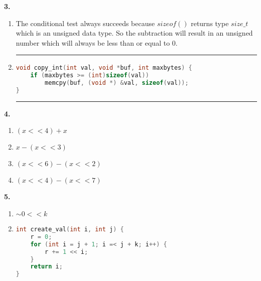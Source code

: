 \documentclass[11pt]{article} %
\newcommand{\hr}{\noindent\rule{14cm}{0.4pt}}
\begin{document}
\vspace{0.5in}
{\bf 3.}
\begin{enumerate}[label=\alph*)]
\item
The conditional test always succeeds because $sizeof()$ returns type $size\_t$ which is an unsigned data type. So the subtraction will result in an unsigned number which will always be less than or equal to $0$.
\item
\hr
\begin{lstlisting}[language=C]
void copy_int(int val, void *buf, int maxbytes) {
	if (maxbytes >= (int)sizeof(val))
		memcpy(buf, (void *) &val, sizeof(val));
}
\end{lstlisting}
\hr


\end{enumerate}


{\bf 4.}

\begin{enumerate}[label=\alph*)]
\item $(x << 4) + x$
\item $x - (x << 3)$
\item $(x << 6) - (x << 2)$
\item $(x << 4) - (x << 7)$
\end{enumerate}


\vspace{0.5in}
{\bf 5.}

\begin{enumerate}[label=\alph*)]

\item
$ \sim 0 << k$

\item
\begin{lstlisting}[language=C]
int create_val(int i, int j) {
	r = 0;
	for (int i = j + 1; i =< j + k; i++) {
		r += 1 << i;
	}
	return i;
}
\end{lstlisting}
\end{enumerate}
\end{document}
